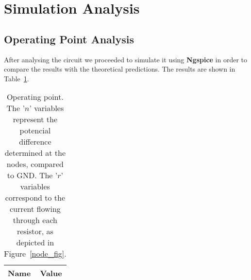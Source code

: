 \section{Simulation Analysis}
\label{sec:simulation}

\subsection{Operating Point Analysis}
\label{sec:op_point}

After analysing the circuit we proceeded to simulate it using {\bf Ngspice} in order to compare the results with the theoretical predictions. The results are shown in Table~\ref{tab:op}.


\begin{table}[h]
	\centering
	\begin{tabular}{|l|c|}
		\hline    
		    {\bf Name} & {\bf Value} \\
                    \hline
                    \hline
		
	\end{tabular}
	\caption{Operating point. The '$n$' variables represent the potencial difference determined at the nodes, compared to GND. The '$r$' variables correspond to the current flowing through each resistor, as depicted in Figure~\ref{node_fig}.}
	\label{tab:op}
\end{table}
